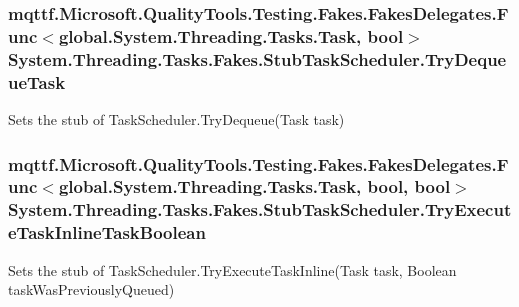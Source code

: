 \hypertarget{class_system_1_1_threading_1_1_tasks_1_1_fakes_1_1_stub_task_scheduler_a1718f01bf72ecb9107d3660373186a7a}{
\subsubsection[{Try\-Dequeue\-Task}]{\setlength{\rightskip}{0pt plus 5cm}mqttf.\-Microsoft.\-Quality\-Tools.\-Testing.\-Fakes.\-Fakes\-Delegates.\-Func$<$global.\-System.\-Threading.\-Tasks.\-Task, bool$>$ System.\-Threading.\-Tasks.\-Fakes.\-Stub\-Task\-Scheduler.\-Try\-Dequeue\-Task}}\label{class_system_1_1_threading_1_1_tasks_1_1_fakes_1_1_stub_task_scheduler_a1718f01bf72ecb9107d3660373186a7a}


Sets the stub of Task\-Scheduler.\-Try\-Dequeue(\-Task task)

\hypertarget{class_system_1_1_threading_1_1_tasks_1_1_fakes_1_1_stub_task_scheduler_a2d27b9d98c848ee0f09ba1576a86c931}{
\subsubsection[{Try\-Execute\-Task\-Inline\-Task\-Boolean}]{\setlength{\rightskip}{0pt plus 5cm}mqttf.\-Microsoft.\-Quality\-Tools.\-Testing.\-Fakes.\-Fakes\-Delegates.\-Func$<$global.\-System.\-Threading.\-Tasks.\-Task, bool, bool$>$ System.\-Threading.\-Tasks.\-Fakes.\-Stub\-Task\-Scheduler.\-Try\-Execute\-Task\-Inline\-Task\-Boolean}}\label{class_system_1_1_threading_1_1_tasks_1_1_fakes_1_1_stub_task_scheduler_a2d27b9d98c848ee0f09ba1576a86c931}


Sets the stub of Task\-Scheduler.\-Try\-Execute\-Task\-Inline(\-Task task, Boolean task\-Was\-Previously\-Queued)



